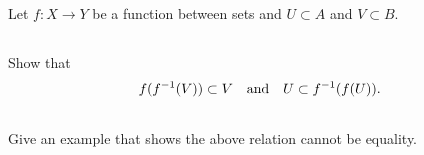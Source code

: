 \documentclass[11pt,letterpaper]{article}
\begin{document}


\section{}
Let $f: X\to Y$ be a function between sets and $U\subset A$ and $V\subset B$. 

\subsection{}
Show that
\begin{align}
    f(f^{-1}(V)) \subset V \quad \mbox{and} \quad U \subset f^{-1}(f(U)).
\end{align}

\subsection{}
Give an example that shows the above relation cannot be equality.



    
    
% 
% 
\end{document}
